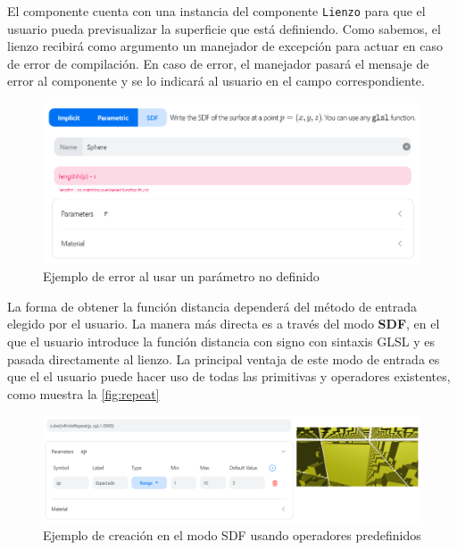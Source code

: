 El componente cuenta con una instancia del componente \texttt{Lienzo} para que el usuario pueda previsualizar la superficie que está definiendo. Como sabemos, el lienzo recibirá como argumento un manejador de excepción para actuar en caso de error de compilación. En caso de error, el manejador pasará el mensaje de error al componente y se lo indicará al usuario en el campo correspondiente.\newline
\begin{figure}[ht!]
    \centering
    \includegraphics[width=\textwidth]{Plantilla-TFG-master/img/error.png}
    \caption{Ejemplo de error al usar un parámetro no definido}
\end{figure}

La forma de obtener la función distancia dependerá del método de entrada elegido por el usuario. La manera más directa es a través del modo \textbf{SDF}, en el que el usuario introduce la función distancia con signo con sintaxis GLSL y es pasada directamente al lienzo. La principal ventaja de este modo de entrada es que el el usuario puede hacer uso de todas las primitivas y operadores existentes, como muestra la \autoref{fig:repeat}\newline
\begin{figure}[ht!]
    \centering
    \includegraphics[width=\textwidth]{Plantilla-TFG-master/img/repeat.png}
    \caption{Ejemplo de creación en el modo SDF usando operadores predefinidos}
    \label{fig:repeat}
\end{figure}

